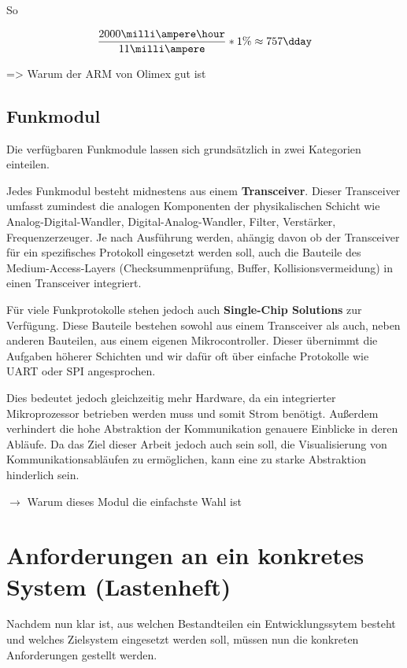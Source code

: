 So 

\begin{equation}\begin{split}
\frac{2000\milli\ampere\hour}{11 \milli\ampere}*1\% \approx 757 \dday
\end{split}\end{equation}


 => Warum der ARM von Olimex gut ist
\subsection{Funkmodul} Die verfügbaren Funkmodule lassen sich grundsätzlich in
zwei Kategorien einteilen.

Jedes Funkmodul besteht midnestens aus einem \textbf{Transceiver}. Dieser
Transceiver umfasst zumindest die analogen Komponenten der physikalischen
Schicht wie Analog-Digital-Wandler, Digital-Analog-Wandler, Filter, Verstärker,
Frequenzerzeuger. Je nach Ausführung werden, ahängig davon ob der Transceiver
für ein spezifisches Protokoll eingesetzt werden soll, auch die Bauteile des
Medium-Access-Layers (Checksummenprüfung, Buffer, Kollisionsvermeidung) in
einen Transceiver integriert.

Für viele Funkprotokolle stehen jedoch auch \textbf{Single-Chip Solutions}
zur Verfügung. Diese Bauteile bestehen sowohl aus einem Transceiver als auch,
neben anderen Bauteilen, aus einem eigenen Mikrocontroller. Dieser übernimmt die
Aufgaben höherer Schichten und wir dafür oft über einfache Protokolle wie UART
oder SPI angesprochen.

Dies bedeutet jedoch gleichzeitig mehr Hardware, da ein integrierter
Mikroprozessor betrieben werden muss und somit Strom benötigt.
Außerdem verhindert die hohe Abstraktion der Kommunikation genauere Einblicke in
deren Abläufe. Da das Ziel dieser Arbeit jedoch auch sein soll, die
Visualisierung von Kommunikationsabläufen zu ermöglichen, kann eine zu starke
Abstraktion hinderlich sein.


 $\rightarrow$ Warum dieses Modul die einfachste Wahl
ist
\section{Anforderungen an ein konkretes System (Lastenheft)}
Nachdem nun klar ist, aus welchen Bestandteilen ein Entwicklungssytem besteht
und welches Zielsystem eingesetzt werden soll, müssen nun die
konkreten Anforderungen gestellt werden.

